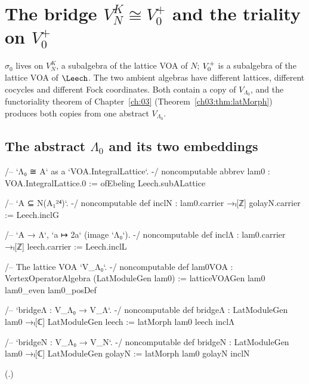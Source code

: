 \section{The bridge \texorpdfstring{$V_N^K\cong V_0^+$}{V\_N\^{}K = V0+} and the triality on \texorpdfstring{$V_0^+$}{V0+}}\label{ch11:sec:bridge}

$\sigma_0$ lives on $V_N^K$, a subalgebra of the lattice VOA of $N$; $V_0^{+}$ is a subalgebra of the
lattice VOA of $\Leech$.  The two ambient algebras have different lattices, different cocycles and
different Fock coordinates.  Both contain a copy of $V_{\Lambda_0}$, and the functoriality theorem of
Chapter~\ref{ch:03} (Theorem~\ref{ch03:thm:latMorph}) produces both copies from one abstract
$V_{\Lambda_0}$.

\subsection{The abstract \texorpdfstring{$\Lambda_0$}{Lambda0} and its two embeddings}

\begin{leancode}
/-- `Λ₀ ≅ A` as a `VOA.IntegralLattice`. -/
noncomputable abbrev lam0 : VOA.IntegralLattice.{0} := ofEbeling Leech.subALattice

/-- `A ⊆ N(A₁²⁴)`. -/
noncomputable def inclN : lam0.carrier →ₗ[ℤ] golayN.carrier := Leech.inclG

/-- `A → Λ`, `a ↦ 2a` (image `Λ₀`). -/
noncomputable def inclΛ : lam0.carrier →ₗ[ℤ] leech.carrier := Leech.inclL

/-- The lattice VOA `V_{Λ₀}`. -/
noncomputable def lam0VOA : VertexOperatorAlgebra (LatModuleGen lam0) :=
  latticeVOAGen lam0 lam0_even lam0_posDef

/-- `bridgeΛ : V_{Λ₀} → V_Λ`. -/
noncomputable def bridgeΛ : LatModuleGen lam0 →ₗ[ℂ] LatModuleGen leech := latMorph lam0 leech inclΛ

/-- `bridgeN : V_{Λ₀} → V_N`. -/
noncomputable def bridgeN : LatModuleGen lam0 →ₗ[ℂ] LatModuleGen golayN := latMorph lam0 golayN inclN
\end{leancode}
(.)

